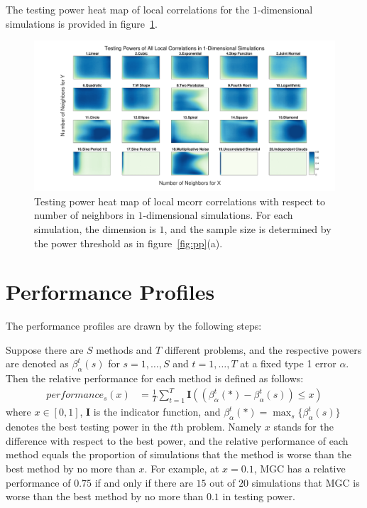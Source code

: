 \documentclass[11pt]{article}
\providecommand{\mb}[1]{\boldsymbol{#1}}
\begin{document}
The testing power heat map of local correlations for the $1$-dimensional simulations is provided in figure~\ref{figSim2}.
\begin{figure}[htbp]
\includegraphics[width=1.0\textwidth]{Figures/Fig2}
\caption{Testing power heat map of local mcorr correlations with respect to number of neighbors in $1$-dimensional simulations. For each simulation, the dimension is $1$, and the sample size is determined by the power threshold as in figure~\ref{fig:pp}(a).
}
\label{figSim2}
\end{figure}

\section{Performance Profiles}
\label{appen:profiles}
The performance profiles are drawn by the following steps:

Suppose there are $S$ methods and $T$ different problems, and the respective powers are denoted as $\beta_{\alpha}^{t}(s)$ for $s=1,\ldots,S$ and $t=1,\ldots,T$ at a fixed type 1 error $\alpha$. Then the relative performance for each method is defined as follows:
\begin{align*}
performance_{s}(x) &= \frac{1}{T} \sum_{t=1}^{T} \mb{I}((\beta_{\alpha}^{t}(*)-\beta_{\alpha}^{t}(s)) \leq x)
\end{align*}
where $x \in [0,1]$, $\mb{I}$ is the indicator function, and $\beta_{\alpha}^{t}(*) =\max_{s} \{\beta_{\alpha}^{t}(s)\}$ denotes the best testing power in the $t$th problem. Namely $x$ stands for the difference with respect to the best power, and the relative performance of each method equals the proportion of simulations that the method is worse than the best method by no more than $x$. For example, at $x=0.1$, MGC has a relative performance of $0.75$ if and only if there are $15$ out of $20$ simulations that MGC is worse than the best method by no more than $0.1$ in testing power. 
\end{document}
